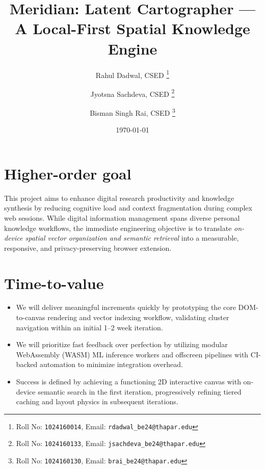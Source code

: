 \documentclass[11pt,a4paper]{article}
\title{Meridian: Latent Cartographer --- A Local-First Spatial Knowledge Engine}
\author{
  Rahul Dadwal, CSED%
  \thanks{Roll No: \texttt{1024160014}, Email: \texttt{rdadwal\_be24@thapar.edu}}
  \and 
  Jyotsna Sachdeva, CSED%
  \thanks{Roll No: \texttt{1024160133}, Email: \texttt{jsachdeva\_be24@thapar.edu}}
  \and 
  Bisman Singh Rai, CSED%
  \thanks{Roll No: \texttt{1024160130}, Email: \texttt{brai\_be24@thapar.edu}}
}
\date{\today}
\begin{document}
\maketitle

\section{Higher-order goal}
This project aims to enhance digital research productivity and knowledge synthesis by reducing cognitive load and context fragmentation during complex web sessions. While digital information management spans diverse personal knowledge workflows, the immediate engineering objective is to translate \emph{on-device spatial vector organization and semantic retrieval} into a measurable, responsive, and privacy-preserving browser extension.

\section{Time-to-value}
\begin{itemize}[leftmargin=0.7cm]
    \item We will deliver meaningful increments quickly by prototyping the core DOM-to-canvas rendering and vector indexing workflow, validating cluster navigation within an initial 1--2 week iteration.
    \item We will prioritize fast feedback over perfection by utilizing modular WebAssembly (WASM) ML inference workers and offscreen pipelines with CI-backed automation to minimize integration overhead.
    \item Success is defined by achieving a functioning 2D interactive canvas with on-device semantic search in the first iteration, progressively refining tiered caching and layout physics in subsequent iterations.
\end{itemize}
\end{document}
